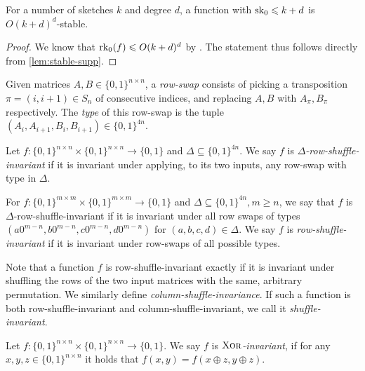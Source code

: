 \documentclass{article}
\begin{document}
\begin{lemma}
    For a number of sketches $k$ and degree $d$, a function with $\operatorname{sk}_0 \leqslant k + d$ is $O(k + d)^d$-stable.
\end{lemma}
    
\begin{proof}
    We know that $\operatorname{rk}_0(f) \leqslant O(k+d)^d$ by
    . The statement thus follows directly from \cref{lem:stable-supp}.
\end{proof}

\begin{boxdefinition}
    Given matrices $A,B \in \{0,1\}^{n\times n}$, a \emph{row-swap} consists of picking a transposition $\pi = (i,i+1)\in S_n$ of consecutive indices, and replacing $A,B$ with $A_\pi,B_\pi$ respectively. The \emph{type} of this row-swap is the tuple $(A_i,A_{i+1},B_i,B_{i+1}) \in \{0,1\}^{4n}$.
\end{boxdefinition}

\begin{boxdefinition}
    Let $f\colon \{0,1\}^{n\times n} \times \{0,1\}^{n\times n}\to \{0,1\}$ and $\Delta \subseteq \{0,1\}^{4n}$. We say $f$ is $\Delta$\emph{-row-shuffle-invariant} if it is invariant under applying, to its two inputs, any row-swap with type in $\Delta$. 
    
    For $f \colon \{0, 1\}^{m \times m} \times \{0, 1\}^{m \times m} \to \{0, 1\}$ and $\Delta \subseteq \{0, 1\}^{4n}, m \geq n$, we say that $f$ is $\Delta$-row-shuffle-invariant if it is invariant under all row swaps of types $(a0^{m-n}, b0^{m - n}, c0^{m - n}, d0^{m - n})$ for $(a, b, c, d) \in \Delta$. We say $f$ is \emph{row-shuffle-invariant} if it is invariant under row-swaps of all possible types.
\end{boxdefinition}

Note that a function $f$ is row-shuffle-invariant exactly if it is invariant under shuffling the rows of the two input matrices with the same, arbitrary permutation. We similarly define \emph{column-shuffle-invariance}. If such a function is both row-shuffle-invariant and column-shuffle-invariant, we call it \emph{shuffle-invariant}.

\begin{boxdefinition}
    Let $f\colon \{0,1\}^{n\times n} \times \{0,1\}^{n\times n}\to \{0,1\}$. We say $f$ is $\operatorname{\textsc{Xor}}$\emph{-invariant}, if for any $x, y, z \in \{0, 1\}^{n \times n}$ it holds that $f(x, y) = f(x \oplus z, y \oplus z)$.
\end{boxdefinition}
\end{document}
